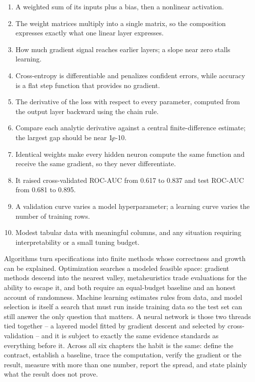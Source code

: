 \begin{enumerate}
    \item A weighted sum of its inputs plus a bias, then a nonlinear activation.
    \item The weight matrices multiply into a single matrix, so the composition
          expresses exactly what one linear layer expresses.
    \item How much gradient signal reaches earlier layers; a slope near zero
          stalls learning.
    \item Cross-entropy is differentiable and penalizes confident errors, while
          accuracy is a flat step function that provides no gradient.
    \item The derivative of the loss with respect to every parameter, computed
          from the output layer backward using the chain rule.
    \item Compare each analytic derivative against a central finite-difference
          estimate; the largest gap should be near \c{1e-10}.
    \item Identical weights make every hidden neuron compute the same function
          and receive the same gradient, so they never differentiate.
    \item It raised cross-validated ROC-AUC from 0.617 to 0.837 and test ROC-AUC
          from 0.681 to 0.895.
    \item A validation curve varies a model hyperparameter; a learning curve
          varies the number of training rows.
    \item Modest tabular data with meaningful columns, and any situation
          requiring interpretability or a small tuning budget.
\end{enumerate}

\begin{tcolorbox}[title=Part VII summary,colframe=orange,colback=white,arc=2mm]
Algorithms turn specifications into finite methods whose correctness and growth
can be explained. Optimization searches a modeled feasible space: gradient
methods descend into the nearest valley, metaheuristics trade evaluations for
the ability to escape it, and both require an equal-budget baseline and an
honest account of randomness. Machine learning estimates rules from data, and
model selection is itself a search that must run inside training data so the
test set can still answer the only question that matters. A neural network is
those two threads tied together -- a layered model fitted by gradient descent and
selected by cross-validation -- and it is subject to exactly the same evidence
standards as everything before it. Across all six chapters the habit is the
same: define the contract, establish a baseline, trace the computation, verify
the gradient or the result, measure with more than one number, report the
spread, and state plainly what the result does not prove.
\end{tcolorbox}

